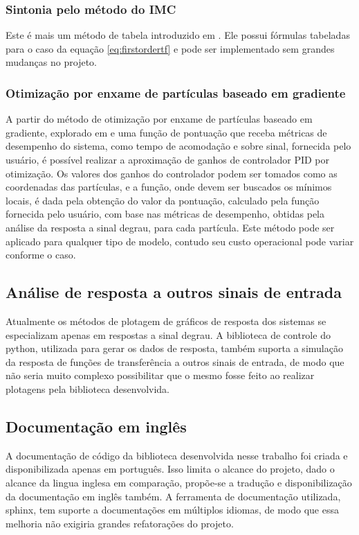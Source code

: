 \subsubsection{Sintonia pelo método do IMC}
Este é mais um método de tabela introduzido em \cite{apostpidsint}.
Ele possui fórmulas tabeladas para o caso da equação \eqref{eq:firstordertf} e pode ser implementado sem grandes
mudanças no projeto.

\subsubsection{Otimização por enxame de partículas baseado em gradiente}
A partir do método de otimização por enxame de partículas baseado em gradiente, explorado em \cite{gpsopt} e uma função
de pontuação que receba métricas de desempenho do sistema, como tempo de acomodação e sobre sinal, fornecida pelo usuário,
é possível realizar a aproximação de ganhos de controlador PID por otimização.
Os valores dos ganhos do controlador podem ser tomados como as coordenadas das partículas, e a função, onde devem ser
buscados os mínimos locais, é dada pela obtenção do valor da pontuação, calculado pela função fornecida pelo
usuário, com base nas métricas de desempenho, obtidas pela análise da resposta a sinal degrau, para cada partícula.
Este método pode ser aplicado para qualquer tipo de modelo, contudo seu custo operacional pode variar conforme o caso.

\subsection{Análise de resposta a outros sinais de entrada}
Atualmente os métodos de plotagem de gráficos de resposta dos sistemas se especializam apenas em respostas a sinal
degrau.
A biblioteca de controle do python, utilizada para gerar os dados de resposta, também suporta a simulação da resposta
de funções de transferência a outros sinais de entrada, de modo que não seria muito complexo possibilitar que o mesmo
fosse feito ao realizar plotagens pela biblioteca desenvolvida.

\subsection{Documentação em inglês}
A documentação de código da biblioteca desenvolvida nesse trabalho foi criada e disponibilizada apenas em português.
Isso limita o alcance do projeto, dado o alcance da lingua inglesa em comparação, propõe-se a tradução e
disponibilização da documentação em inglês também.
A ferramenta de documentação utilizada, sphinx, tem suporte a documentações em múltiplos idiomas, de modo que essa
melhoria não exigiria grandes refatorações do projeto.

